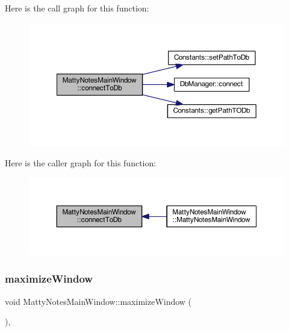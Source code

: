 Here is the call graph for this function\+:
\nopagebreak
\begin{figure}[H]
\begin{center}
\leavevmode
\includegraphics[width=350pt]{classMattyNotesMainWindow_acd6f123f89d4e5f1d240cbd54e92d1fc_cgraph}
\end{center}
\end{figure}
Here is the caller graph for this function\+:
\nopagebreak
\begin{figure}[H]
\begin{center}
\leavevmode
\includegraphics[width=350pt]{classMattyNotesMainWindow_acd6f123f89d4e5f1d240cbd54e92d1fc_icgraph}
\end{center}
\end{figure}
\hypertarget{classMattyNotesMainWindow_aa04cca9a2d55f2f1625bd18892a8814a}{}\label{classMattyNotesMainWindow_aa04cca9a2d55f2f1625bd18892a8814a} 
\subsubsection{\texorpdfstring{maximize\+Window}{maximizeWindow}}
{\footnotesize\ttfamily void Matty\+Notes\+Main\+Window\+::maximize\+Window (\begin{DoxyParamCaption}{ }\end{DoxyParamCaption})\hspace{0.3cm}{\ttfamily [private]}, {\ttfamily [slot]}}



